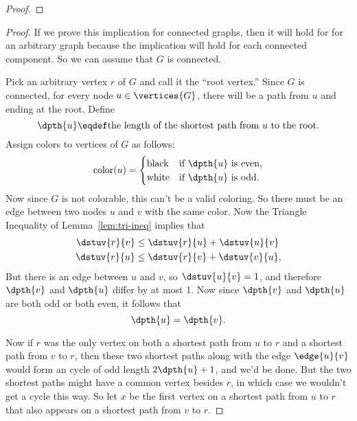 \begin{description}
\begin{proof}
\end{proof}

\begin{editingnotes}

\begin{proof}
  If we prove this implication for connected graphs, then it will hold for
  for an arbitrary graph because the implication will hold for each
  connected component.  So we can assume that $G$ is connected.

  Pick an arbitrary vertex $r$ of $G$ and call it the ``root vertex.''
  Since $G$ is connected, for every node $u \in \vertices{G}$, there will
  be a path from $u$ and ending at the root.  Define
\[
\dpth{u} \eqdef \text{the length of the shortest path from $u$ to the root.}
\]
Assign colors to vertices of $G$ as follows:
\[
\text{color}(u) = \begin{cases}
                   \text{black} & \text{if $\dpth{u}$ is even},\\
                   \text{white} & \text{if $\dpth{u}$ is odd}.
\end{cases}
\]
Now since $G$ is not colorable, this can't be a valid coloring.  So there
must be an edge between two nodes $u$ and $v$ with the same color.
Now the Triangle Inequality of Lemma~\ref{lem:tri-ineq} implies that
\begin{align*}
\dstuv{r}{v} & \leq \dstuv{r}{u} + \dstuv{u}{v}\\
\dstuv{r}{u} & \leq \dstuv{r}{v} + \dstuv{v}{u},
\end{align*}
But there is an edge between $u$ and $v$, so $\dstuv{u}{v} =1$, and therefore
$\dpth{v}$ and $\dpth{u}$ differ by at most 1.  Now since $\dpth{v}$ and
$\dpth{u}$ are both odd or both even, it follows that
\begin{equation}\label{dpthu=}
\dpth{u} = \dpth{v}.
\end{equation}

Now if $r$ was the only vertex on both a shortest path from $u$ to $r$ and
a shortest path from $v$ to $r$, then these two shortest paths along with
the edge $\edge{u}{v}$ would form an cycle of odd length $2\dpth{u} +1$,
and we'd be done. But the two shortest paths might have a common vertex
besides $r$, in which case we wouldn't get a cycle this way.  So let $x$
be the first vertex on a shortest path from $u$ to $r$ that also appears
on a shortest path from $v$ to $r$.


\end{proof}
\end{editingnotes}
\end{description}
